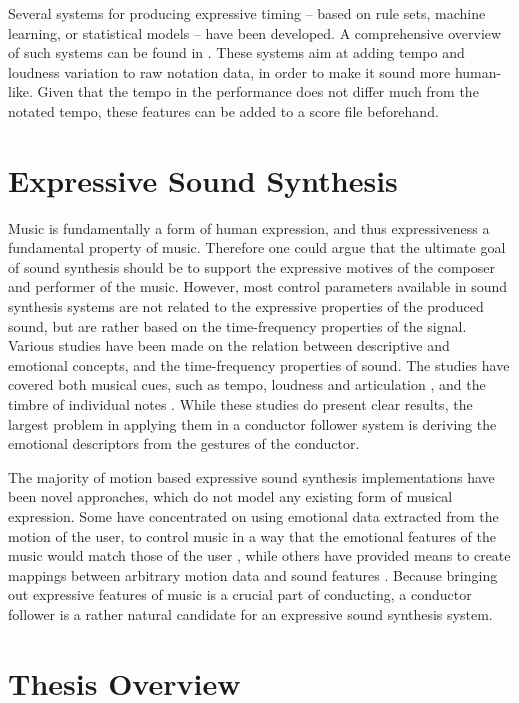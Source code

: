 Several systems for producing expressive timing --
based on rule sets, machine learning, or statistical models --
have been developed.
A comprehensive overview of such systems can be found in \cite{Kirke2012}.
These systems aim at adding tempo and loudness variation
to raw notation data,
in order to make it sound more human-like.
Given that the tempo in the performance does not differ much
from the notated tempo,
these features can be added to a score file beforehand.


\section{Expressive Sound Synthesis}

Music is fundamentally a form of human expression,
and thus expressiveness a fundamental property of music.
Therefore one could argue that the ultimate goal of sound synthesis should be to support
the expressive motives of the composer and performer of the music.
However, most control parameters available in sound synthesis systems
are not related to the expressive properties of the produced sound,
but are rather based on the time-frequency properties of the signal.
Various studies have been made on the relation between
descriptive and emotional concepts,
and the time-frequency properties of sound.
The studies have covered both musical cues,
such as tempo, loudness and articulation \cite{juslin2000cue},
and the timbre of individual notes \cite{moravec2005}.
While these studies do present clear results,
the largest problem in applying them in a conductor follower system
is deriving the emotional descriptors from the
gestures of the conductor. 

The majority of motion based expressive sound synthesis implementations
have been novel approaches,
which do not model any existing form of musical expression.
Some have concentrated on using emotional data
extracted from the motion of the user,
to control music in a way that the
emotional features of the music would match those of the user \cite{friberg2004},
while others have provided means to create mappings
between arbitrary motion data and sound features \cite{kia2004}.
Because bringing out expressive features of music is a crucial part of conducting,
a conductor follower is a rather natural candidate for
an expressive sound synthesis system.

\section{Thesis Overview}

